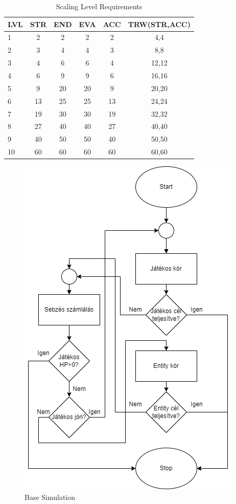 \begin{table}[!ht]
    \centering
    \caption{Scaling Level Requirements}
    \label{table:scalingleveltable}
    \begin{tabular}{|l|c|c|c|c|c|}
        \hline
        LVL & STR  & END & EVA & ACC & TRW(STR,ACC) \\
        \hline
        1 & 2 & 2 & 2 & 2 & 4,4 \\
        \hline
        2 & 3 & 4 & 4 & 3 & 8,8 \\
        \hline
        3 & 4 & 6 & 6 & 4 & 12,12 \\
        \hline
        4 & 6 & 9 & 9 & 6 & 16,16 \\
        \hline
        5 & 9 & 20 & 20 & 9 & 20,20 \\
        \hline
        6 & 13 & 25 & 25 & 13 & 24,24 \\
        \hline
        7 & 19 & 30 & 30 & 19 & 32,32 \\
        \hline
        8 & 27 & 40 & 40 & 27 & 40,40 \\
        \hline
        9 & 40 & 50 & 50 & 40 & 50,50 \\
        \hline
        10 & 60 & 60 & 60 & 60 & 60,60 \\
        \hline
    \end{tabular}
\end{table}

\begin{figure}[!ht]
	\centering
	\includegraphics[scale=0.8]{images/gameUML.png}
	\caption{Base Simulation}
	\label{fig:basegame}
\end{figure}

